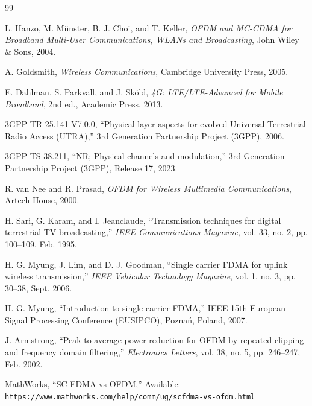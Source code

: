 \documentclass{article}
\begin{document}
\begin{thebibliography}{99}

L. Hanzo, M. Münster, B. J. Choi, and T. Keller,
\textit{OFDM and MC-CDMA for Broadband Multi-User Communications, WLANs and Broadcasting},
John Wiley \& Sons, 2004.

A. Goldsmith,
\textit{Wireless Communications},
Cambridge University Press, 2005.

E. Dahlman, S. Parkvall, and J. Sköld,
\textit{4G: LTE/LTE-Advanced for Mobile Broadband},
2nd ed., Academic Press, 2013.

3GPP TR 25.141 V7.0.0,
``Physical layer aspects for evolved Universal Terrestrial Radio Access (UTRA),''
3rd Generation Partnership Project (3GPP), 2006.

3GPP TS 38.211,
``NR; Physical channels and modulation,''
3rd Generation Partnership Project (3GPP), Release 17, 2023.

R. van Nee and R. Prasad,
\textit{OFDM for Wireless Multimedia Communications},
Artech House, 2000.

H. Sari, G. Karam, and I. Jeanclaude,
``Transmission techniques for digital terrestrial TV broadcasting,''
\textit{IEEE Communications Magazine},
vol. 33, no. 2, pp. 100--109, Feb. 1995.

H. G. Myung, J. Lim, and D. J. Goodman,
``Single carrier FDMA for uplink wireless transmission,''
\textit{IEEE Vehicular Technology Magazine},
vol. 1, no. 3, pp. 30--38, Sept. 2006.

H. G. Myung,
``Introduction to single carrier FDMA,''
IEEE 15th European Signal Processing Conference (EUSIPCO),
Poznań, Poland, 2007.

J. Armstrong,
``Peak-to-average power reduction for OFDM by repeated clipping and frequency domain filtering,''
\textit{Electronics Letters},
vol. 38, no. 5, pp. 246--247, Feb. 2002.

MathWorks,
``SC-FDMA vs OFDM,''
Available: \texttt{https://www.mathworks.com/help/comm/ug/scfdma-vs-ofdm.html}

\end{thebibliography}


\end{document}

